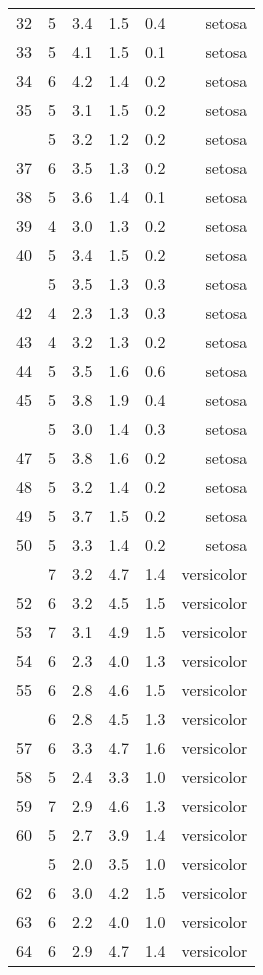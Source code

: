\documentclass[a4paper, 10pt]{article}\usepackage[]{graphicx}\usepackage[]{color}
\begin{document}
\begin{longtable}{llcrlr}
32 & 5 & 3.4 & 1.5 & 0.4 & setosa\\
33 & 5 & 4.1 & 1.5 & 0.1 & setosa\\
34 & 6 & 4.2 & 1.4 & 0.2 & setosa\\
35 & 5 & 3.1 & 1.5 & 0.2 & setosa\\
\addlinespace
36 & 5 & 3.2 & 1.2 & 0.2 & setosa\\
37 & 6 & 3.5 & 1.3 & 0.2 & setosa\\
38 & 5 & 3.6 & 1.4 & 0.1 & setosa\\
39 & 4 & 3.0 & 1.3 & 0.2 & setosa\\
40 & 5 & 3.4 & 1.5 & 0.2 & setosa\\
\addlinespace
41 & 5 & 3.5 & 1.3 & 0.3 & setosa\\
42 & 4 & 2.3 & 1.3 & 0.3 & setosa\\
43 & 4 & 3.2 & 1.3 & 0.2 & setosa\\
44 & 5 & 3.5 & 1.6 & 0.6 & setosa\\
45 & 5 & 3.8 & 1.9 & 0.4 & setosa\\
\addlinespace
46 & 5 & 3.0 & 1.4 & 0.3 & setosa\\
47 & 5 & 3.8 & 1.6 & 0.2 & setosa\\
48 & 5 & 3.2 & 1.4 & 0.2 & setosa\\
49 & 5 & 3.7 & 1.5 & 0.2 & setosa\\
50 & 5 & 3.3 & 1.4 & 0.2 & setosa\\
\addlinespace
51 & 7 & 3.2 & 4.7 & 1.4 & versicolor\\
52 & 6 & 3.2 & 4.5 & 1.5 & versicolor\\
53 & 7 & 3.1 & 4.9 & 1.5 & versicolor\\
54 & 6 & 2.3 & 4.0 & 1.3 & versicolor\\
55 & 6 & 2.8 & 4.6 & 1.5 & versicolor\\
\addlinespace
56 & 6 & 2.8 & 4.5 & 1.3 & versicolor\\
57 & 6 & 3.3 & 4.7 & 1.6 & versicolor\\
58 & 5 & 2.4 & 3.3 & 1.0 & versicolor\\
59 & 7 & 2.9 & 4.6 & 1.3 & versicolor\\
60 & 5 & 2.7 & 3.9 & 1.4 & versicolor\\
\addlinespace
61 & 5 & 2.0 & 3.5 & 1.0 & versicolor\\
62 & 6 & 3.0 & 4.2 & 1.5 & versicolor\\
63 & 6 & 2.2 & 4.0 & 1.0 & versicolor\\
64 & 6 & 2.9 & 4.7 & 1.4 & versicolor\\

\end{longtable}
\end{document}
